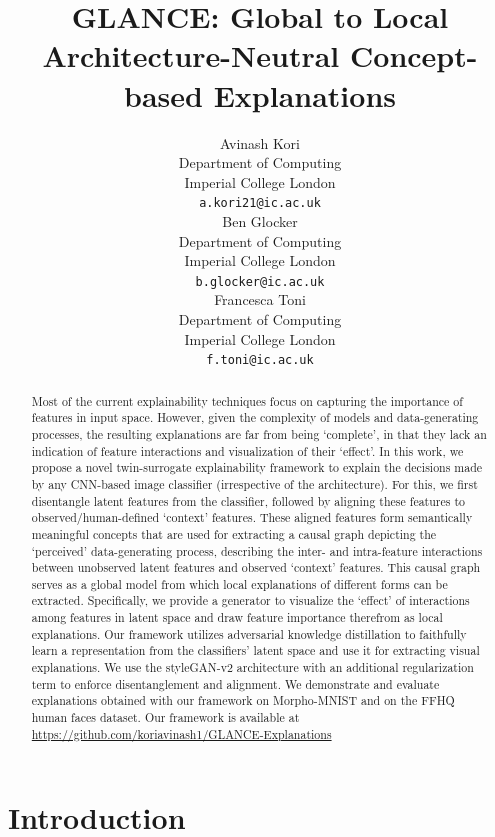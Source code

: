 \documentclass{article}
\title{GLANCE: Global to Local Architecture-Neutral Concept-based Explanations}
\author{%
  Avinash Kori\\
  Department of Computing\\
  Imperial College London\\
  \texttt{a.kori21@ic.ac.uk} \\
  \And
  Ben Glocker\\
  Department of Computing\\
  Imperial College London\\
  \texttt{b.glocker@ic.ac.uk} \\
  \And 
  Francesca Toni\\
  Department of Computing\\
  Imperial College London\\
  \texttt{f.toni@ic.ac.uk} \\
}
\begin{document}
\maketitle


\begin{abstract}
Most of the current explainability techniques focus on capturing the importance of features in input space. 
However, given the complexity of models and data-generating processes, the resulting explanations are far from being `complete', in that they lack an indication of feature interactions and visualization of their `effect'.
In this work, we propose a novel twin-surrogate explainability framework to explain the decisions made by any CNN-based image classifier (irrespective of the architecture). 
For this, we first disentangle latent features from the classifier, followed by aligning these features to observed/human-defined `context' features.  
These aligned features form semantically meaningful concepts that are used for extracting a causal graph depicting the `perceived'  data-generating process, describing the inter- and intra-feature interactions between unobserved latent features and observed `context' features.
This causal graph serves as a global model from which local explanations of different forms can be extracted.
Specifically, we  provide a generator to visualize the `effect' of interactions among features in latent space and draw feature importance therefrom as local explanations.
Our framework utilizes adversarial knowledge distillation to faithfully learn a representation from the classifiers' latent space and use it for extracting visual explanations. 
We use the styleGAN-v2 architecture with an additional regularization term to enforce disentanglement and alignment.
We demonstrate and evaluate explanations obtained with our framework on Morpho-MNIST and on the FFHQ human faces dataset.
Our framework is available at \url{https://github.com/koriavinash1/GLANCE-Explanations}
\end{abstract}



\section{Introduction}
\end{document}

